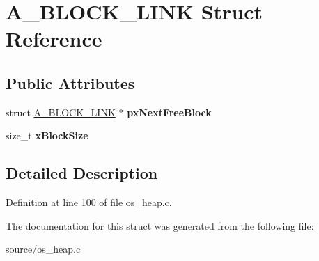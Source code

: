 \hypertarget{structA__BLOCK__LINK}{}\section{A\+\_\+\+B\+L\+O\+C\+K\+\_\+\+L\+I\+NK Struct Reference}
\label{structA__BLOCK__LINK}
\subsection*{Public Attributes}
\begin{DoxyCompactItemize}
\item 
\mbox{\label{structA__BLOCK__LINK_a005de4303d4b4e61065e77d97c9774fe}} 
struct \mbox{\hyperlink{structA__BLOCK__LINK}{A\+\_\+\+B\+L\+O\+C\+K\+\_\+\+L\+I\+NK}} $\ast$ {\bfseries px\+Next\+Free\+Block}
\item 
\mbox{\label{structA__BLOCK__LINK_ad5dcf5df03d8be6186c567be9e2c657b}} 
size\+\_\+t {\bfseries x\+Block\+Size}
\end{DoxyCompactItemize}


\subsection{Detailed Description}


Definition at line 100 of file os\+\_\+heap.\+c.



The documentation for this struct was generated from the following file\+:\begin{DoxyCompactItemize}
\item 
source/os\+\_\+heap.\+c\end{DoxyCompactItemize}
